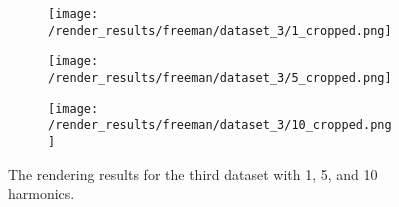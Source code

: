 \documentclass[thesis.tex]{subfiles}
\begin{document}
\begin{figure}[!htb]
\centering
\begin{subfigure}{0.30\textwidth}
		\texttt{[image: /render\_results/freeman/dataset\_3/1\_cropped.png]}
	\caption{}	
\label{fig:dataset3_a}	
	\end{subfigure}
\begin{subfigure}{0.30\textwidth}
		\texttt{[image: /render\_results/freeman/dataset\_3/5\_cropped.png]}
	\caption{}		
\label{fig:dataset3_b}
	\end{subfigure}
\begin{subfigure}{0.30\textwidth}
		\texttt{[image: /render\_results/freeman/dataset\_3/10\_cropped.png]}
	\caption{}		
\label{fig:dataset3_c}
	\end{subfigure}
\caption{The rendering results for the third dataset with 1, 5, and 10 harmonics.}
\label{fig:dataset3}
\end{figure}
\end{document}
